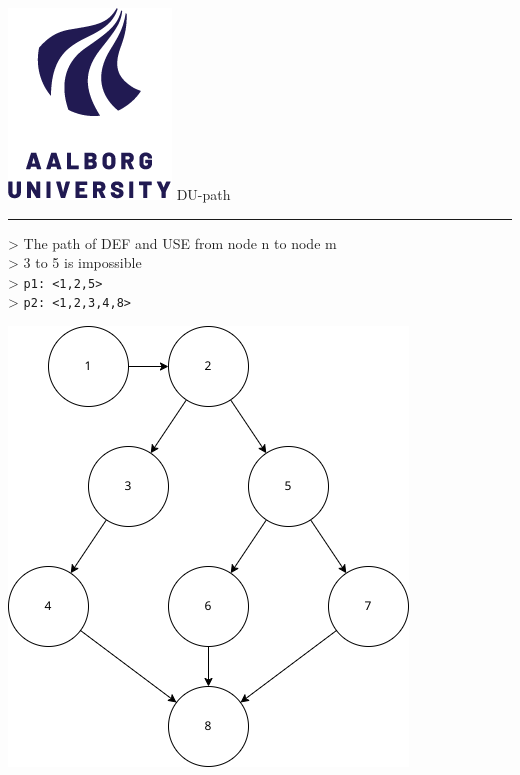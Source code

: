 \documentclass[aspectratio=1610,17pt,utf8]{beamer}
\newcommand{\regularframe}[1]{\color{black}\includegraphics[width=.05\textwidth]{figures/aau.png} #1\\\hrule}
\newcommand{\rf}[1]{\regularframe{#1}}
\newcommand{\minip}[2]{\begin{minipage}{#1}#2\end{minipage}}
\begin{document}
\begin{frame}{\rf{DU-path}}
    \begin{minipage}{.45\textwidth}
    > The path of DEF and USE from node n to node m\\
    > 3 to 5 is impossible\\
    > \texttt{p1: <1,2,5>}\\
    > \texttt{p2: <1,2,3,4,8>}

    \end{minipage}
    \minip{.45\textwidth}{\includegraphics[width=\textwidth]{figures/du-path.drawio.png}}

\end{frame}
\end{document}
